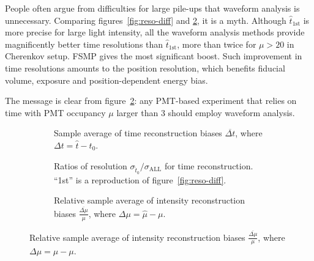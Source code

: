 People often argue from difficulties for large pile-ups that waveform analysis is unnecessary.  Comparing figures~\ref{fig:reso-diff} and \ref{fig:deltamethods}, it is a myth.  Although $\hat{t}_\mathrm{1st}$ is more precise for large light intensity, all the waveform analysis methods provide magnificently better time resolutions than $\hat{t}_\mathrm{1st}$, more than twice for $\mu>20$ in Cherenkov setup.  FSMP gives the most significant boost.  Such improvement in time resolutions amounts to the position resolution, which benefits fiducial volume, exposure and position-dependent energy bias.

The message is clear from figure~\ref{fig:deltamethods}: any PMT-based experiment that relies on time with PMT occupancy $\mu$ larger than 3 should employ waveform analysis.

\begin{figure}[H]
  \begin{subfigure}[b]{\textwidth}
    \centering
    \resizebox{0.99\textwidth}{!}{}
    \vspace{-0.5em}
    \caption{\label{fig:biasmethods} Sample average of time reconstruction biases $\overline{\Delta t}$, where $\Delta t = \hat{t} - t_0$.}
  \end{subfigure}

  \vspace{0.5em}
  \begin{subfigure}[b]{\textwidth}
    \centering
    \resizebox{0.99\textwidth}{!}{}
    \vspace{-0.5em}
    \caption{\label{fig:deltamethods} Ratios of resolution $\sigma_{\hat{t}_0}/\sigma_{\mathrm{ALL}}$ for time reconstruction. ``1st'' is a reproduction of figure~\ref{fig:reso-diff}.}
  \end{subfigure}

  \vspace{0.5em}
  \begin{subfigure}[b]{\textwidth}
    \centering
    \resizebox{0.99\textwidth}{!}{}
    \vspace{-0.5em}
    \caption{\label{fig:biasmu} Relative sample average of intensity reconstruction biases $\frac{\overline{\Delta \mu}}{\mu}$, where $\Delta \mu = \hat{\mu} - \mu$.}
  \end{subfigure}


\end{figure}

